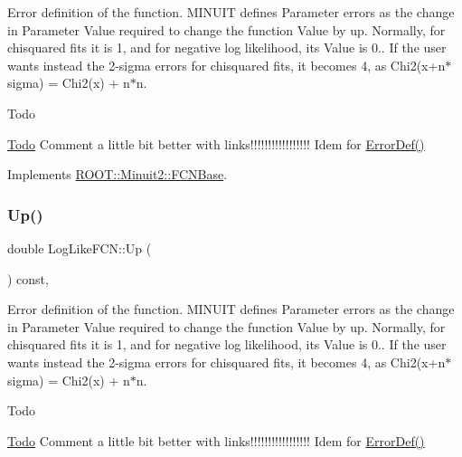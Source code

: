Error definition of the function. M\+I\+N\+U\+IT defines Parameter errors as the change in Parameter Value required to change the function Value by up. Normally, for chisquared fits it is 1, and for negative log likelihood, its Value is 0.. If the user wants instead the 2-\/sigma errors for chisquared fits, it becomes 4, as Chi2(x+n$\ast$sigma) = Chi2(x) + n$\ast$n.

\begin{DoxyRefDesc}{Todo}
\item[\mbox{\hyperlink{todo__todo000001}{Todo}}]Comment a little bit better with links!!!!!!!!!!!!!!!!! Idem for \mbox{\hyperlink{classROOT_1_1Minuit2_1_1FCNBase_ac4592475c58a65b037ba97ab5f3cba10}{Error\+Def()}}\end{DoxyRefDesc}


Implements \mbox{\hyperlink{classROOT_1_1Minuit2_1_1FCNBase_a04ef08ddad92ce8d89d498efbe021c39}{R\+O\+O\+T\+::\+Minuit2\+::\+F\+C\+N\+Base}}.

\mbox{\label{structLogLikeFCN_ace81f647c3b49597fdfa5a9ff88e56d4}} 
\subsubsection{\texorpdfstring{Up()}{Up()}\hspace{0.1cm}{\footnotesize\ttfamily [2/2]}}
{\footnotesize\ttfamily double Log\+Like\+F\+C\+N\+::\+Up (\begin{DoxyParamCaption}{ }\end{DoxyParamCaption}) const\hspace{0.3cm}{\ttfamily [inline]}, {\ttfamily [virtual]}}

Error definition of the function. M\+I\+N\+U\+IT defines Parameter errors as the change in Parameter Value required to change the function Value by up. Normally, for chisquared fits it is 1, and for negative log likelihood, its Value is 0.. If the user wants instead the 2-\/sigma errors for chisquared fits, it becomes 4, as Chi2(x+n$\ast$sigma) = Chi2(x) + n$\ast$n.

\begin{DoxyRefDesc}{Todo}
\item[\mbox{\hyperlink{todo__todo000001}{Todo}}]Comment a little bit better with links!!!!!!!!!!!!!!!!! Idem for \mbox{\hyperlink{classROOT_1_1Minuit2_1_1FCNBase_ac4592475c58a65b037ba97ab5f3cba10}{Error\+Def()}}\end{DoxyRefDesc}


